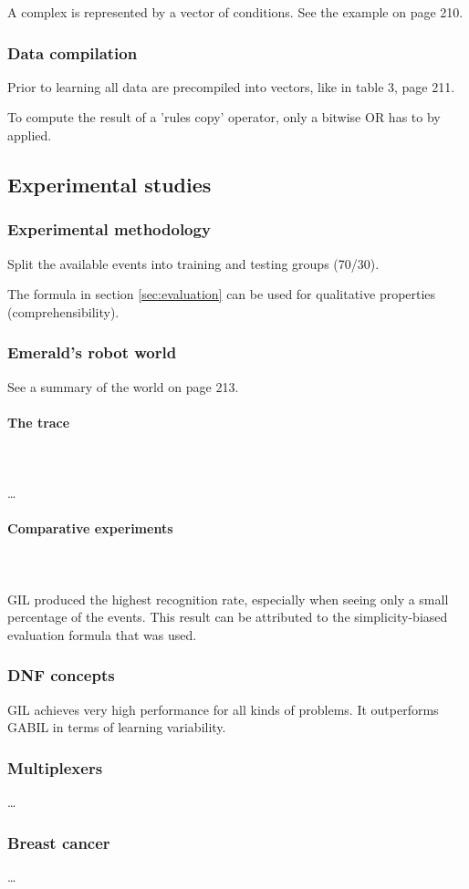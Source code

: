 \documentclass[12pt]{article}
\newcommand{\myparagraph}[1]{\paragraph{#1}\mbox{}\\\\}
\begin{document}
A complex is represented by a vector of conditions. See the example on page 210.

\subsubsection{Data compilation}
Prior to learning all data are precompiled into vectors, like in table 3, page 211.

To compute the result of a 'rules copy' operator, only a bitwise OR has to by applied.

\subsection{Experimental studies}
\subsubsection{Experimental methodology}
Split the available events into training and testing groups (70/30).

The formula in section \ref{sec:evaluation} can be used for qualitative properties (comprehensibility).

\subsubsection{Emerald's robot world}
See a summary of the world on page 213.

\myparagraph{The trace}
\dots

\myparagraph{Comparative experiments}
GIL produced the highest recognition rate, especially when seeing only a small percentage of the events. This result can be attributed to the simplicity-biased evaluation formula that was used.

\subsubsection{DNF concepts}
GIL achieves very high performance for all kinds of problems. It outperforms GABIL in terms of learning variability.

\subsubsection{Multiplexers}
\dots

\subsubsection{Breast cancer}
\dots
\end{document}
